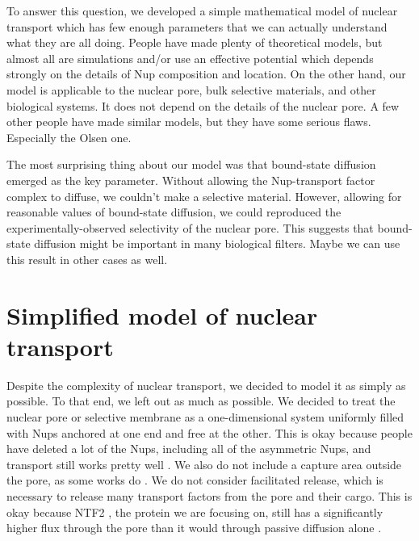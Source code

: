 To answer this question, we developed a simple mathematical model of nuclear transport which has few enough parameters that we can actually understand what they are all doing.  People have made plenty of theoretical models, but almost all are simulations and/or use an effective potential which depends strongly on the details of Nup composition and location.  On the other hand, our model is applicable to the nuclear pore, bulk selective materials, and other biological systems.  It does not depend on the details of the nuclear pore.  A few other people have made similar models, but they have some serious flaws.  Especially the Olsen one.

The most surprising thing about our model was that bound-state diffusion emerged as the key parameter.  Without allowing the Nup-transport factor complex to diffuse, we couldn't make a selective material.  However, allowing for reasonable values of bound-state diffusion, we could reproduced the experimentally-observed selectivity of the nuclear pore.  This suggests that bound-state diffusion might be important in many biological filters.  Maybe we can use this result in other cases as well.

\section{Simplified model of nuclear transport}

Despite the complexity of nuclear transport, we decided to model it as simply as possible.  To that end, we left out as much as possible.  We decided to treat the nuclear pore or selective membrane as a one-dimensional system uniformly filled with Nups anchored at one end and free at the other.  This is okay because people have deleted a lot of the Nups, including all of the asymmetric Nups, and transport still works pretty well \cite{strawn04, zeitler04,kowalczyk11, jovanovic-talisman09}.  We also do not include a capture area outside the pore, as some works do \cite{pagliara14}.  We do not consider facilitated release, which is necessary to release many transport factors from the pore and their cargo\cite{lowe15, mincer11, gorlich96, gilchrist02}.  This is okay because NTF2 \cite{ribbeck98}, the protein we are focusing on, still has a significantly higher flux through the pore than it would through passive diffusion alone \cite{mincer11, zilman07}. 

